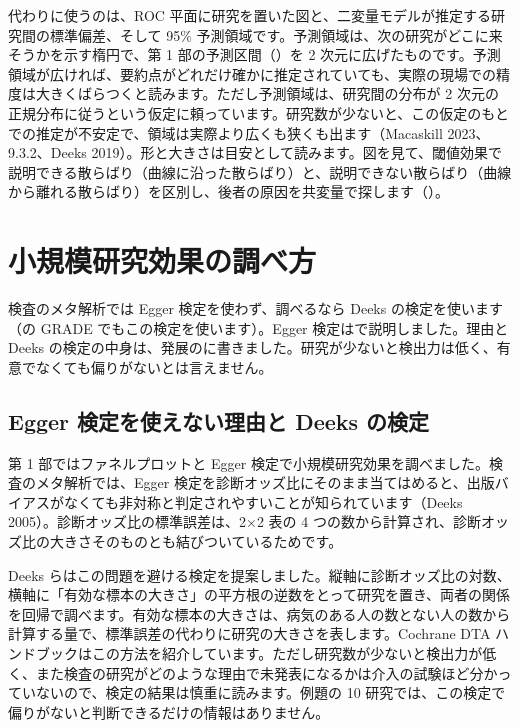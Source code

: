 代わりに使うのは、ROC 平面に研究を置いた図と、二変量モデルが推定する研究間の標準偏差、そして 95\% 予測領域です。予測領域は、次の研究がどこに来そうかを示す楕円で、第 1 部の予測区間（）を 2 次元に広げたものです。予測領域が広ければ、要約点がどれだけ確かに推定されていても、実際の現場での精度は大きくばらつくと読みます。ただし予測領域は、研究間の分布が 2 次元の正規分布に従うという仮定に頼っています。研究数が少ないと、この仮定のもとでの推定が不安定で、領域は実際より広くも狭くも出ます（Macaskill 2023、9.3.2、Deeks 2019）。形と大きさは目安として読みます。図を見て、閾値効果で説明できる散らばり（曲線に沿った散らばり）と、説明できない散らばり（曲線から離れる散らばり）を区別し、後者の原因を共変量で探します（）。

\section{小規模研究効果の調べ方}
\label{sec:10-8}

検査のメタ解析では Egger 検定を使わず、調べるなら Deeks の検定を使います（の GRADE でもこの検定を使います）。Egger 検定はで説明しました。理由と Deeks の検定の中身は、発展のに書きました。研究が少ないと検出力は低く、有意でなくても偏りがないとは言えません。

\subsection{\hatten Egger 検定を使えない理由と Deeks の検定}
\label{sec:10-8-1}

第 1 部ではファネルプロットと Egger 検定で小規模研究効果を調べました。検査のメタ解析では、Egger 検定を診断オッズ比にそのまま当てはめると、出版バイアスがなくても非対称と判定されやすいことが知られています（Deeks 2005）。診断オッズ比の標準誤差は、2×2 表の 4 つの数から計算され、診断オッズ比の大きさそのものとも結びついているためです。

Deeks らはこの問題を避ける検定を提案しました。縦軸に診断オッズ比の対数、横軸に「有効な標本の大きさ」の平方根の逆数をとって研究を置き、両者の関係を回帰で調べます。有効な標本の大きさは、病気のある人の数とない人の数から計算する量で、標準誤差の代わりに研究の大きさを表します。Cochrane DTA ハンドブックはこの方法を紹介しています。ただし研究数が少ないと検出力が低く、また検査の研究がどのような理由で未発表になるかは介入の試験ほど分かっていないので、検定の結果は慎重に読みます。例題の 10 研究では、この検定で偏りがないと判断できるだけの情報はありません。

